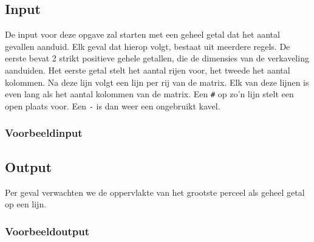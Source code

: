 \documentclass[a4paper]{article}
\begin{document}
\subsection*{Input}

De input voor deze opgave zal starten met een geheel getal dat het aantal
gevallen aanduid. Elk geval dat hierop volgt, bestaat uit meerdere regels. De
eerste bevat 2 strikt positieve gehele getallen, die de dimensies van de
verkaveling aanduiden. Het eerste getal stelt het aantal rijen voor, het tweede
het aantal kolommen. Na deze lijn volgt een lijn per rij van de matrix. Elk van
deze lijnen is even lang als het aantal kolommen van de matrix. Een \texttt{\#}
op zo'n lijn stelt een open plaats voor. Een \texttt{-} is dan weer een
ongebruikt kavel.

\subsubsection*{Voorbeeldinput}



\subsection*{Output}

Per geval verwachten we de oppervlakte van het grootste perceel als geheel getal
op een lijn.

\subsubsection*{Voorbeeldoutput}


\end{document}
